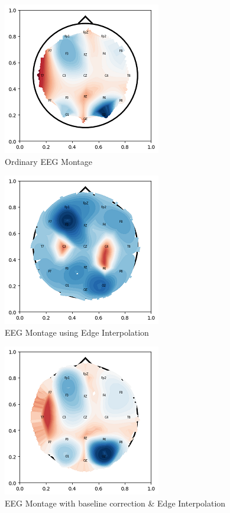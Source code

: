\documentclass[conference]{IEEEconf}
\begin{document}
\clearpage
\begin{figure}
  \includegraphics{ordinary_montage.png}
  \caption{Ordinary EEG Montage}
  \label{fig:ordinary eeg montage}
\end{figure}
\begin{figure}
  \includegraphics{edge_mean_montage.png}
  \caption{EEG Montage using Edge Interpolation}
  \label{fig:EEG montage with edge}
\end{figure}
\begin{figure}
  \includegraphics{edge_mean_baseline_montage.png}
  \caption{EEG Montage with baseline correction \& Edge Interpolation}
  \label{fig:EEG montage with edge and baseline correction}
\end{figure}
\end{document}
